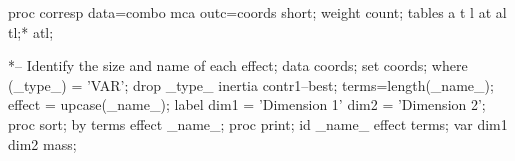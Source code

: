 \begin{listing}
proc corresp data=combo  mca outc=coords short;
   weight count;
   tables a t l at al tl;* atl;

*-- Identify the size and name of each effect;
data coords;
   set coords;
   where (_type_) = 'VAR';
   drop _type_ inertia contr1--best;
   terms=length(_name_);
   effect = upcase(_name_);
   label dim1 = 'Dimension 1'
         dim2 = 'Dimension 2';
proc sort;
   by terms effect _name_;
proc print;
   id _name_ effect terms;
   var dim1 dim2 mass;
\end{listing}
